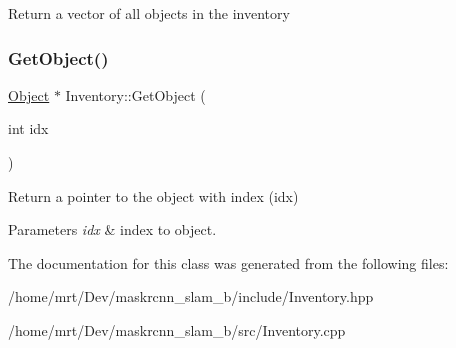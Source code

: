 Return a vector of all objects in the inventory \mbox{\label{classInventory_ab7bfc70ba945972f1bb1bb440b0e6d5c}} 
\subsubsection{\texorpdfstring{Get\+Object()}{GetObject()}}
{\footnotesize\ttfamily \hyperlink{classObject}{Object} $\ast$ Inventory\+::\+Get\+Object (\begin{DoxyParamCaption}\item[{int}]{idx }\end{DoxyParamCaption})}

Return a pointer to the object with index (idx) 
\begin{DoxyParams}{Parameters}
{\em idx} & index to object. \\
\hline
\end{DoxyParams}


The documentation for this class was generated from the following files\+:\begin{DoxyCompactItemize}
\item 
/home/mrt/\+Dev/maskrcnn\+\_\+slam\+\_\+b/include/Inventory.\+hpp\item 
/home/mrt/\+Dev/maskrcnn\+\_\+slam\+\_\+b/src/Inventory.\+cpp\end{DoxyCompactItemize}
